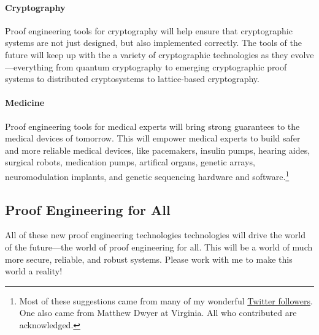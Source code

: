 \paragraph{Cryptography}
Proof engineering tools for cryptography will help ensure that cryptographic systems are not just designed, but also implemented correctly.
The tools of the future will keep up with the a variety of cryptographic technologies as they evolve---everything from quantum cryptography
to emerging cryptographic proof systems to distributed cryptosystems to lattice-based cryptography.

\paragraph{Medicine} 
Proof engineering tools for medical experts will bring strong guarantees to the medical devices of tomorrow.
This will empower medical experts to build safer and more reliable medical devices,
like pacemakers, insulin pumps, hearing aides, surgical robots, medication pumps, artifical organs,
genetic arrays, neuromodulation implants, and genetic sequencing hardware and 
software.\footnote{Most of these suggestions came from many of my wonderful \href{https://twitter.com/TaliaRinger/status/1388282607926857731}{Twitter followers}.
One also came from Matthew Dwyer at Virginia. All who contributed are acknowledged.}


\subsection*{Proof Engineering for All}

All of these new proof engineering technologies technologies will drive the world of the future---the world of proof engineering for all.
This will be a world of much more secure, reliable, and robust systems.
Please work with me to make this world a reality!

